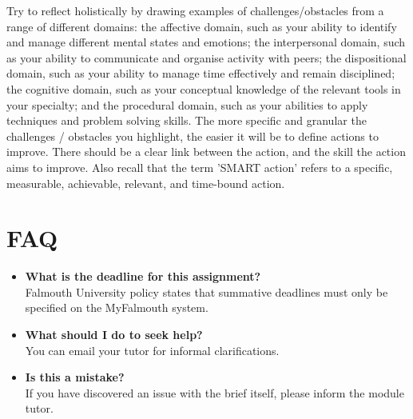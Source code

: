 \documentclass{../../fal_assignment}
\begin{document}
Try to reflect holistically by drawing examples of challenges/obstacles from a range of different domains: the affective domain, such as your ability to identify and manage different mental states and emotions; the interpersonal domain, such as your ability to communicate and organise activity with peers; the dispositional domain, such as your ability to manage time effectively and remain disciplined; the cognitive domain, such as your conceptual knowledge of the relevant tools in your specialty; and the procedural domain, such as your abilities to apply techniques and problem solving skills. The more specific and granular the challenges / obstacles you highlight, the easier it will be to define actions to improve. There should be a clear link between the action, and the skill the action aims to improve. Also recall that the term ’SMART action’ refers to a specific, measurable, achievable, relevant, and time-bound action.

\pagebreak
\section*{FAQ}

\begin{itemize}
	\item 	\textbf{What is the deadline for this assignment?} \\ 
    		Falmouth University policy states that summative deadlines must only be specified on the MyFalmouth system.
	\item 	\textbf{What should I do to seek help?} \\ 
    		You can email your tutor for informal clarifications.    		
    	\item 	\textbf{Is this a mistake?} \\ 	
    		If you have discovered an issue with the brief itself, please inform the module tutor.
\end{itemize}
\end{document}
